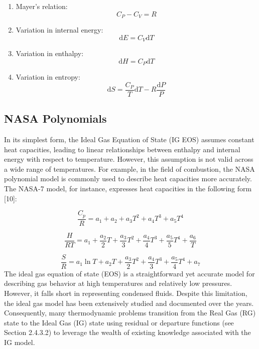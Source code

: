 	\begin{enumerate}
		\item Mayer's relation:
		\begin{equation}
			C_P - C_V = R
		\end{equation}

		\item Variation in internal energy:
		\begin{equation}
			\mathrm{d}E = C_V\mathrm{d}T
		\end{equation}

		\item Variation in enthalpy:
		\begin{equation}
			\mathrm{d}H = C_P\mathrm{d}T
		\end{equation}

		\item Variation in entropy:
		\begin{equation}
			\mathrm{d}S = \frac{C_P}{T}\mathrm{d}T - R\frac{\mathrm{d}P}{P}
		\end{equation}

	\end{enumerate}

	\subsection{NASA Polynomials}
	
	In its simplest form, the Ideal Gas Equation of State (IG EOS) assumes
	constant heat capacities, leading to linear relationships between enthalpy
	and internal energy with respect to temperature. However, this assumption is
	not valid across a wide range of temperatures. For example, in the field of
	combustion, the NASA polynomial model is commonly used to describe heat
	capacities more accurately. The NASA-7 model, for instance, expresses heat
	capacities in the following form [10]:

	\begin{equation}
		\frac{C_p}{R} = a_1 + a_2 + a_3 T^2 + a_4 T^3 + a_5 T^4
	\end{equation}

	\begin{equation}
		\frac{H}{RT} = a_1 + \frac{a_2}{2}T + \frac{a_3}{3}T^2 + \frac{a_4}{4}T^3 + \frac{a_5}{5}T^4 + \frac{a_6}{T}
	\end{equation}

	\begin{equation}
		\frac{S}{R} = a_1 \ln T + a_2 T + \frac{a_3}{2}T^2 + \frac{a_4}{3}T^3 + \frac{a_5}{4}T^4 + a_7
	\end{equation}
	The ideal gas equation of state (EOS) is a straightforward yet accurate
	model for describing gas behavior at high temperatures and relatively low
	pressures. However, it falls short in representing condensed fluids. Despite
	this limitation, the ideal gas model has been extensively studied and
	documented over the years. Consequently, many thermodynamic problems
	transition from the Real Gas (RG) state to the Ideal Gas (IG) state using
	residual or departure functions (see Section 2.4.3.2) to leverage the wealth
	of existing knowledge associated with the IG model.



